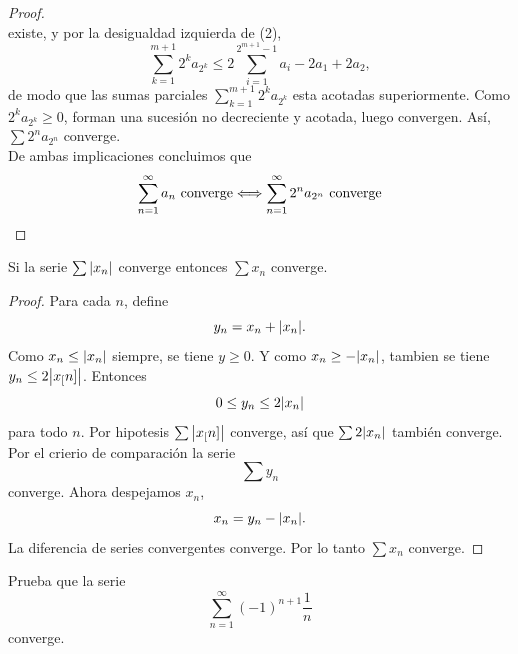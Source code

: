 \documentclass[12pt,a4paper]{article}
\begin{document}
\begin{proof}
\begin{equation*}
        \end{equation*}
        existe, y por la desigualdad izquierda de (2),
        \begin{equation*}
            \sum_{k=1}^{m+1}2^{k}a_{2^{k}}\leq2\sum_{i=1}^{2^{m+1}-1}a_{i}-2a_{1}+2a_{2},
        \end{equation*}
        de modo que las sumas parciales $\sum_{k=1}^{m+1}2^{k}a_{2^{k}}$ esta acotadas superiormente. Como
        $2^{k}a_{2^{k}}\geq0$, forman una sucesión no decreciente y acotada, luego convergen. Así, $\sum2^{n}a_{2^{n}}$
        converge.\\
        De ambas implicaciones concluimos que
        \begin{equation*}
            \sum_{n=1}^{\infty}a_{n}\text{ converge}\Longleftrightarrow\sum_{n=1}^{\infty}2^{n}a_{2^{n}}\text{ converge}
        \end{equation*}
    \end{proof}

    \begin{ejercicio}
        Si la serie $\sum\abs{x_{n}}$ converge entonces $\sum x_{n}$
        converge.
    \end{ejercicio}

    \begin{proof}
        Para cada $n$, define
        \begin{equation*}
            y_{n}=x_{n}+\abs{x_{n}}.
        \end{equation*}
        Como $x_{n}\leq\abs{x_{n}}$ siempre, se tiene $y\geq0$.
        Y como $x_{n}\geq-\abs{x_{n}}$, tambien se tiene $y_{n}\leq2\abs{x_[n]}$.
        Entonces
        \begin{equation*}
            0\leq y_{n}\leq 2\abs{x_{n}}
        \end{equation*}
        para todo $n$. Por hipotesis $\sum\abs{x_[n]}$ converge, así que $\sum2\abs{x_{n}}$
        también converge. Por el crierio de comparación la serie
        \begin{equation*}
            \sum y_{n}
        \end{equation*}
        converge. Ahora despejamos $x_{n}$,
        \begin{equation*}
            x_{n}=y_{n}-\abs{x_{n}}.
        \end{equation*}
        La diferencia de series convergentes converge. Por lo tanto
        $\sum x_{n}$ converge.
    \end{proof}

    \begin{ejercicio}
        Prueba que la serie
        \begin{equation*}
            \sum_{n=1}^{\infty}(-1)^{n+1}\frac1n
        \end{equation*}
        converge.
    \end{ejercicio}
\end{document}
